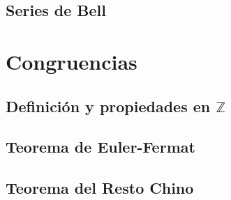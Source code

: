 \documentclass{article}
\theoremstyle{definition}
\theoremstyle{remark}
\newcommand{\BZ}{\mathbb Z}
\begin{document}
\subsection{Series de Bell}

\newpage
\section{Congruencias}
\subsection{Definici\'on y propiedades en $\BZ$}


\subsection{Teorema de Euler-Fermat}


\subsection{Teorema del Resto Chino}

\end{document}
